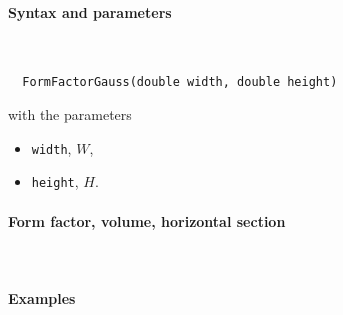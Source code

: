 \paragraph{Syntax and parameters}\strut\\[-2ex plus .2ex minus .2ex]
\begin{lstlisting}
  FormFactorGauss(double width, double height)
\end{lstlisting}
with the parameters
\begin{itemize}
\item \texttt{width}, $W$,
\item \texttt{height}, $H$.
\end{itemize}

\paragraph{Form factor, volume, horizontal section}\strut\\

\paragraph{Examples}\strut

